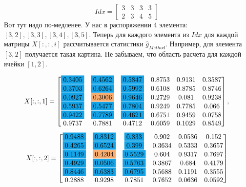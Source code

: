 \documentclass[a4paper,11pt]{article}
\begin{document}
		$$
		Idx = 
		\begin{bmatrix}
			3 & 3 & 3 & 3\\
			2 & 3 & 4 & 5
		\end{bmatrix}
		$$
		Вот тут надо по-медленее. У нас в распоряжении 4 элемента: $[3, 2], [3, 3], [3, 4], [3, 5]$. Теперь для каждого элемента из $Idx$ для каждой матрицы $X[:, :, i]$ рассчитывается статистики $\widehat{g}_{Method}$. Например, для элемента $[3, 2]$ получается такая картина. Не забываем, что область расчета для каждой ячейки $[1, 2]$.
		
		$$X[:, :, 1] = 
		\begin{bmatrix}
			 \colorbox{Cerulean}{0.3405} & \colorbox{Cerulean}{0.4562} & \colorbox{Cerulean}{0.5847} & 0.8753 & 0.9131 & 0.3587\\
			 \colorbox{Cerulean}{0.3703} & \colorbox{Cerulean}{0.6264} & \colorbox{Cerulean}{0.5992} & 0.6108 & 0.8785 & 0.8746\\
			 \colorbox{Cerulean}{0.0927} & \colorbox{Apricot}{0.3006} & \colorbox{Cerulean}{0.9646} & 0.2729 & 0.081 & 0.9238\\
			 \colorbox{Cerulean}{0.5937} & \colorbox{Cerulean}{0.5477} & \colorbox{Cerulean}{0.7804} & 0.9249 & 0.7785 & 0.066\\
			 \colorbox{Cerulean}{0.9422} & \colorbox{Cerulean}{0.7789} & \colorbox{Cerulean}{0.4621} & 0.6751 & 0.9459 & 0.0758\\
			 0.9737 & 0.7881 & 0.4712 & 0.6059 & 0.1029 & 0.8549
		\end{bmatrix},$$
		$$ 
		X[:, :, 2] = 
		\begin{bmatrix}
			 \colorbox{Cerulean}{0.9488} & \colorbox{Cerulean}{0.8312} & \colorbox{Cerulean}{0.833} & 0.902 & 0.0536 & 0.152\\
		     \colorbox{Cerulean}{0.4265} & \colorbox{Cerulean}{0.6524} & \colorbox{Cerulean}{0.399} & 0.3634 & 0.5333 & 0.3657\\
			 \colorbox{Cerulean}{0.1149} & \colorbox{Apricot}{0.4204} & \colorbox{Cerulean}{0.5529} & 0.604 &  0.9317 & 0.7697\\
			 \colorbox{Cerulean}{0.4929} & \colorbox{Cerulean}{0.0506} & \colorbox{Cerulean}{0.5763} & 0.3867 & 0.684 & 0.4179\\
			 \colorbox{Cerulean}{0.8446} & \colorbox{Cerulean}{0.6383} & \colorbox{Cerulean}{0.6795} & 0.5688 & 0.1191 & 0.3555\\
			 0.2888 & 0.9298 & 0.7851 & 0.7652 & 0.0636 & 0.0592
		\end{bmatrix}
		$$
		
\end{document}
